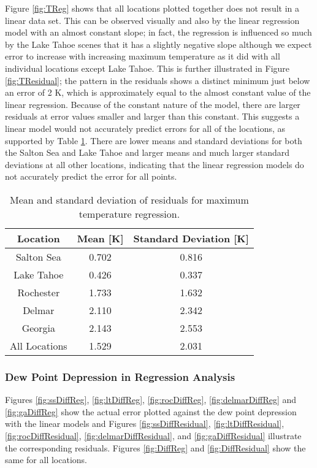 \documentclass{book}
\begin{document}
Figure \ref{fig:TReg} shows that all locations plotted together does not result in a linear data set.  This can be observed visually and also by the linear regression model with an almost constant slope; in fact, the regression is influenced so much by the Lake Tahoe scenes that it has a slightly negative slope although we expect error to increase with increasing maximum temperature as it did with all individual locations except Lake Tahoe.  This is further illustrated in Figure \ref{fig:TResidual}; the pattern in the residuals shows a distinct minimum just below an error of 2 K, which is approximately equal to the almost constant value of the linear regression.  Because of the constant nature of the model, there are larger residuals at error values smaller and larger than this constant.  This suggests a linear model would not accurately predict errors for all of the locations, as supported by Table \ref{tab:TResidual}.  There are lower means and standard deviations for both the Salton Sea and Lake Tahoe and larger means and much larger standard deviations at all other locations, indicating that the linear regression models do not accurately predict the error for all points.

\begin{table}[H]
\begin{center}
\begin{tabular}{| c | c | c |}
\hline
Location & Mean [K] & Standard Deviation [K] \\ \hline
Salton Sea & 0.702 & 0.816 \\ \hline
Lake Tahoe & 0.426 & 0.337 \\ \hline
Rochester & 1.733 & 1.632 \\ \hline
Delmar & 2.110 & 2.342 \\ \hline
Georgia & 2.143 & 2.553 \\ \hline
All Locations & 1.529 & 2.031 \\ \hline
\end{tabular}
\caption{Mean and standard deviation of residuals for maximum temperature regression.}
\label{tab:TResidual}
\end{center}
\end{table}

\subsubsection{Dew Point Depression in Regression Analysis}

Figures \ref{fig:ssDiffReg}, \ref{fig:ltDiffReg}, \ref{fig:rocDiffReg}, \ref{fig:delmarDiffReg} and \ref{fig:gaDiffReg} show the actual error plotted against the dew point depression with the linear models and Figures \ref{fig:ssDiffResidual}, \ref{fig:ltDiffResidual}, \ref{fig:rocDiffResidual}, \ref{fig:delmarDiffResidual}, and \ref{fig:gaDiffResidual} illustrate the corresponding residuals.  Figures \ref{fig:DiffReg} and \ref{fig:DiffResidual} show the same for all locations.  
\end{document}
